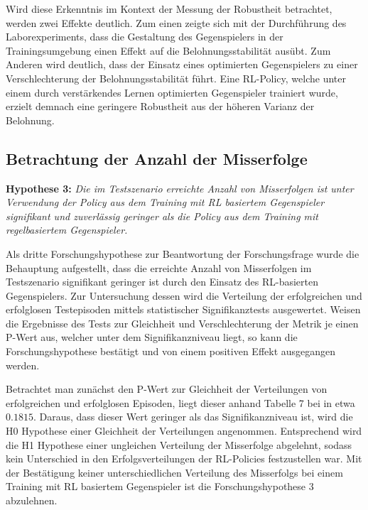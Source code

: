 Wird diese Erkenntnis im Kontext der Messung der Robustheit betrachtet, werden zwei Effekte deutlich.
Zum einen zeigte sich mit der Durchführung des Laborexperiments, dass die Gestaltung des Gegenspielers in der Trainingsumgebung einen Effekt auf die Belohnungsstabilität ausübt.
Zum Anderen wird deutlich, dass der Einsatz eines optimierten Gegenspielers zu einer Verschlechterung der Belohnungsstabilität führt.
Eine RL-Policy, welche unter einem durch verstärkendes Lernen optimierten Gegenspieler trainiert wurde, erzielt demnach eine geringere Robustheit aus der höheren Varianz der Belohnung.

\subsection{Betrachtung der Anzahl der Misserfolge}

\textbf{Hypothese 3:}
\textit{Die im Testszenario erreichte Anzahl von Misserfolgen ist unter Verwendung der Policy aus dem Training mit RL basiertem Gegenspieler signifikant und zuverlässig geringer als die Policy aus dem Training mit regelbasiertem Gegenspieler.}

Als dritte Forschungshypothese zur Beantwortung der Forschungsfrage wurde die Behauptung aufgestellt, dass die erreichte Anzahl von Misserfolgen im Testszenario signifikant geringer ist durch den Einsatz des RL-basierten Gegenspielers.
Zur Untersuchung dessen wird die Verteilung der erfolgreichen und erfolglosen Testepisoden mittels statistischer Signifikanztests ausgewertet. 
Weisen die Ergebnisse des Tests zur Gleichheit und Verschlechterung der Metrik je einen P-Wert aus, welcher unter dem Signifikanzniveau liegt, so kann die Forschungshypothese bestätigt und von einem positiven Effekt ausgegangen werden.

Betrachtet man zunächst den P-Wert zur Gleichheit der Verteilungen von erfolgreichen und erfolglosen Episoden, liegt dieser anhand Tabelle 7 bei in etwa $0.1815$.
Daraus, dass dieser Wert geringer als das Signifikanzniveau ist, wird die H0 Hypothese einer Gleichheit der Verteilungen angenommen.
Entsprechend wird die H1 Hypothese einer ungleichen Verteilung der Misserfolge abgelehnt, sodass kein Unterschied in den Erfolgsverteilungen der RL-Policies festzustellen war.
Mit der Bestätigung keiner unterschiedlichen Verteilung des Misserfolgs bei einem Training mit RL basiertem Gegenspieler ist die Forschungshypothese 3 abzulehnen.

